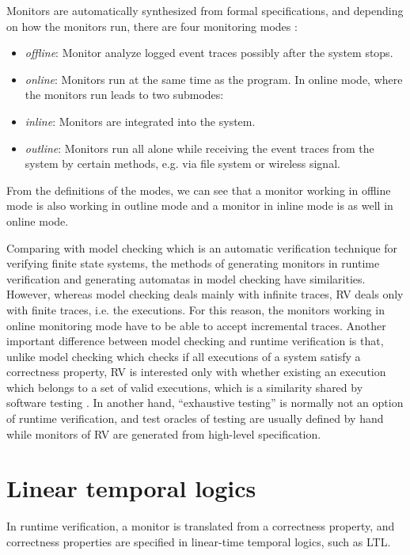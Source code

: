 Monitors are automatically synthesized from formal specifications, and depending on how the monitors run, there are four monitoring modes \citep{chen2007mop}:
\begin{itemize}
\item \emph{offline}: Monitor analyze logged event traces possibly after the system stops.
\item \emph{online}: Monitors run at the same time as the program. In online mode, where the monitors run leads to two submodes:
\item \emph{inline}: Monitors are integrated into the system.
\item \emph{outline}: Monitors run all alone while receiving the event traces from the system by certain methods, e.g. via file system or wireless signal.
\end{itemize}
From the definitions of the modes, we can see that a monitor working in offline mode is also working in outline mode and a monitor in inline mode is as well in online mode.

Comparing with model checking \citep{clarke1999model} which is an automatic verification technique for verifying finite state systems, the methods of generating monitors in runtime verification and generating automatas in model checking have similarities. However, whereas model checking deals mainly with infinite traces, RV deals only with finite traces, i.e. the executions. For this reason, the monitors working in online monitoring mode have to be able to accept incremental traces. Another important difference between model checking and runtime verification is that, unlike model checking which checks if all executions of a system satisfy a correctness property, RV is interested only with whether existing an execution which belongs to a set of valid executions, which is a similarity shared by software testing \citep{broy2005model}. In another hand, ``exhaustive testing'' is normally not an option of runtime verification, and test oracles of testing are usually defined by hand while monitors of RV are generated from high-level specification.

\section{Linear temporal logics}

In runtime verification, a monitor is translated from a correctness property, and correctness properties are specified in linear-time temporal logics, such as LTL.

